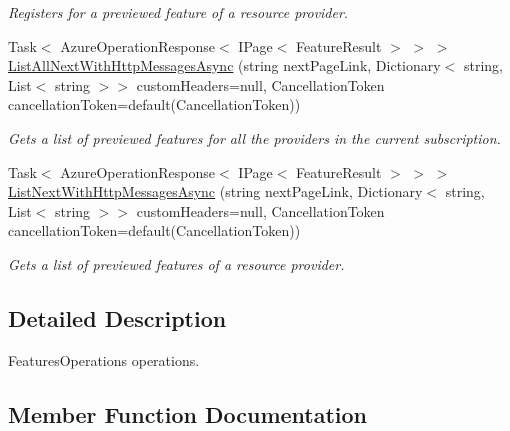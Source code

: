 \begin{DoxyCompactItemize}
\begin{DoxyCompactList}\small\item\em Registers for a previewed feature of a resource provider. \end{DoxyCompactList}\item 
Task$<$ Azure\+Operation\+Response$<$ I\+Page$<$ Feature\+Result $>$ $>$ $>$ \hyperlink{interface_microsoft_1_1_azure_1_1_management_1_1_resources_1_1_i_features_operations_aaebc2d4dceec07e27b1784dbdb4ad764}{List\+All\+Next\+With\+Http\+Messages\+Async} (string next\+Page\+Link, Dictionary$<$ string, List$<$ string $>$$>$ custom\+Headers=null, Cancellation\+Token cancellation\+Token=default(Cancellation\+Token))
\begin{DoxyCompactList}\small\item\em Gets a list of previewed features for all the providers in the current subscription. \end{DoxyCompactList}\item 
Task$<$ Azure\+Operation\+Response$<$ I\+Page$<$ Feature\+Result $>$ $>$ $>$ \hyperlink{interface_microsoft_1_1_azure_1_1_management_1_1_resources_1_1_i_features_operations_a167272af669ce6388a7c278b7d58d6f7}{List\+Next\+With\+Http\+Messages\+Async} (string next\+Page\+Link, Dictionary$<$ string, List$<$ string $>$$>$ custom\+Headers=null, Cancellation\+Token cancellation\+Token=default(Cancellation\+Token))
\begin{DoxyCompactList}\small\item\em Gets a list of previewed features of a resource provider. \end{DoxyCompactList}\end{DoxyCompactItemize}


\subsection{Detailed Description}
Features\+Operations operations. 



\subsection{Member Function Documentation}
